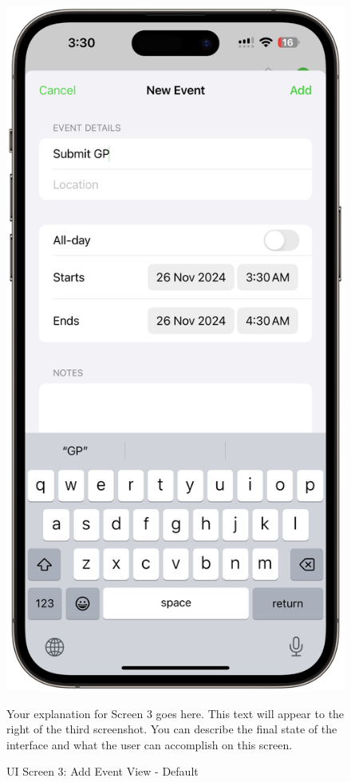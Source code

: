 \begin{figure}[!h]
    \begin{minipage}{0.3\textwidth}
        \centering
        \includegraphics[width=\textwidth]{images/screen3.png}
        \caption{UI Screen 3: Add Event View - Default}
        \label{fig:ui-screen-3}
    \end{minipage}
    \hfill
    \begin{minipage}{0.65\textwidth}
        Your explanation for Screen 3 goes here. This text will appear to the right 
        of the third screenshot. You can describe the final state of the interface 
        and what the user can accomplish on this screen.
    \end{minipage}
\end{figure}

